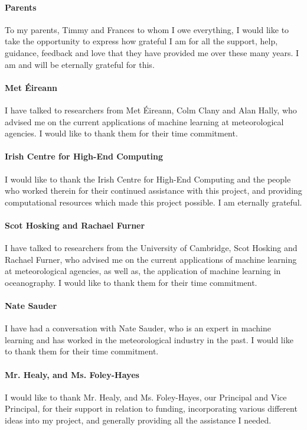 \paragraph{Parents} To my parents, Timmy and Frances to whom I owe everything, I would like to take the opportunity to express how grateful I am for all the support, help, guidance, feedback and love that they have provided me over these many years. I am and will be eternally grateful for this.

\paragraph{Met Éireann}
I have talked to researchers from Met Éireann, Colm Clany and Alan Hally, who advised me on the current applications of machine learning at meteorological agencies. I would like to thank them for their time commitment.

\paragraph{Irish Centre for High-End Computing}
I would like to thank the Irish Centre for High-End Computing and the people who worked therein for their continued assistance with this project, and providing computational resources which made this project possible. I am eternally grateful.

\paragraph{Scot Hosking and Rachael Furner}
I have talked to researchers from the University of Cambridge, Scot Hosking and Rachael Furner, who advised me on the current applications of machine learning at meteorological agencies, as well as, the application of machine learning in oceanography. I would like to thank them for their time commitment.

\paragraph{Nate Sauder}
I have had a conversation with Nate Sauder, who is an expert in machine learning and has worked in the meteorological industry in the past. I would like to thank them for their time commitment.

\paragraph{Mr. Healy, and Ms. Foley-Hayes}
I would like to thank Mr. Healy, and Ms. Foley-Hayes, our Principal and Vice Principal, for their support in relation to funding, incorporating various different ideas into my project, and generally providing all the assistance I needed.
